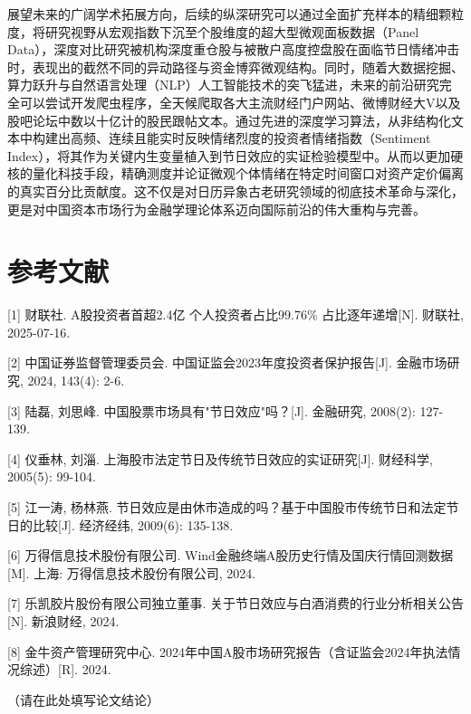 \documentclass{cupb-thesis}
\begin{document}
{展望未来的广阔学术拓展方向，后续的纵深研究可以通过全面扩充样本的精细颗粒度，将研究视野从宏观指数下沉至个股维度的超大型微观面板数据（Panel Data），深度对比研究被机构深度重仓股与被散户高度控盘股在面临节日情绪冲击时，表现出的截然不同的异动路径与资金博弈微观结构。同时，随着大数据挖掘、算力跃升与自然语言处理（NLP）人工智能技术的突飞猛进，未来的前沿研究完全可以尝试开发爬虫程序，全天候爬取各大主流财经门户网站、微博财经大V以及股吧论坛中数以十亿计的股民跟帖文本。通过先进的深度学习算法，从非结构化文本中构建出高频、连续且能实时反映情绪烈度的投资者情绪指数（Sentiment Index），将其作为关键内生变量植入到节日效应的实证检验模型中。从而以更加硬核的量化科技手段，精确测度并论证微观个体情绪在特定时间窗口对资产定价偏离的真实百分比贡献度。这不仅是对日历异象古老研究领域的彻底技术革命与深化，更是对中国资本市场行为金融学理论体系迈向国际前沿的伟大重构与完善。


\chapter*{参考文献}


[1] 财联社. A股投资者首超2.4亿 个人投资者占比99.76\% 占比逐年递增[N]. 财联社, 2025-07-16.


[2] 中国证券监督管理委员会. 中国证监会2023年度投资者保护报告[J]. 金融市场研究, 2024, 143(4): 2-6.


[3] 陆磊, 刘思峰. 中国股票市场具有"节日效应"吗？[J]. 金融研究, 2008(2): 127-139.


[4] 仪垂林, 刘淄. 上海股市法定节日及传统节日效应的实证研究[J]. 财经科学, 2005(5): 99-104.


[5] 江一涛, 杨林燕. 节日效应是由休市造成的吗？基于中国股市传统节日和法定节日的比较[J]. 经济经纬, 2009(6): 135-138.


[6] 万得信息技术股份有限公司. Wind金融终端A股历史行情及国庆行情回测数据[M]. 上海: 万得信息技术股份有限公司, 2024.


[7] 乐凯胶片股份有限公司独立董事. 关于节日效应与白酒消费的行业分析相关公告[N]. 新浪财经, 2024.


[8] 金牛资产管理研究中心. 2024年中国A股市场研究报告（含证监会2024年执法情况综述）[R]. 2024.



\begin{conclusion}
（请在此处填写论文结论）
\end{conclusion}

}
\end{document}
